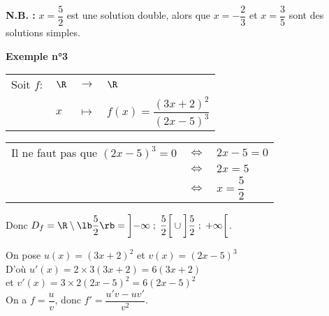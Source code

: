 \vspace*{.5cm}

\textbf{N.B. :} $x = \dfrac{5}{2}$ est une solution double, alors que $x = -\dfrac{2}{3}$ et $x = \dfrac{3}{5}$ sont des solutions simples.

\vspace*{-5cm}

\newpage

\textbf{Exemple n°3} \\

\begin{tabular}{llll}
\hspace{-.3cm} Soit $f:$ & $\R$ & $\longrightarrow$ & $\R$ \\
& $x$ & $\longmapsto$ & $f(x) = \dfrac{\left(3x+2\right)^2}{\left(2x-5\right)^3}$ \\
\end{tabular}

\vspace*{.3cm}

\begin{tabular}{lll}
\hspace*{-.3cm} Il ne faut pas que $\left(2x-5\right)^3 = 0$ & $\Longleftrightarrow$ & $2x-5 = 0$ \\
& $\Longleftrightarrow$ & $2x = 5$ \\
& $\Longleftrightarrow$ & $x = \dfrac{5}{2}$ \\
\end{tabular}

\vspace*{.3cm}

Donc $D_f = \R \setminus \lb \dfrac{5}{2} \rb = \left]-\infty \; ; \; \dfrac{5}{2} \right[\cup \left]\dfrac{5}{2} \; ; \; +\infty\right[$. \\

\vspace*{.3cm}

On pose $u(x) = \left(3x+2\right)^2$ et $v(x) = \left(2x - 5\right)^3$ \\
D'où $u'(x) = 2\times 3\left(3x+2\right) = 6\left(3x+2\right)$ \\ et $v'(x) = 3 \times 2\left(2x-5\right)^2 = 6\left(2x-5\right)^2$ \\

On a $f = \dfrac{u}{v}$, donc $f' = \dfrac{u'v - uv'}{v^2}$. \vspace*{.3cm} \\

